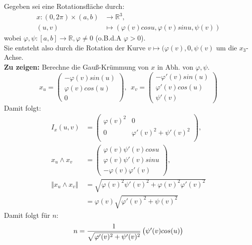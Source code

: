 \begin{problem*}[2a]
Gegeben sei eine Rotationsfläche durch:
\begin{align*}
	x:(0,2\pi) \times (a,b) &\to \mathbb{R}^3, \\
	(u,v) &\mapsto (\varphi(v)cosu, \varphi(v)sinu, \psi(v))
\end{align*}
wobei $\varphi, \psi: [a,b] \to \mathbb{R}, \varphi \neq 0$ (o.B.d.A $\varphi > 0$).\\ 
Sie entsteht also durch die Rotation der Kurve $ v \mapsto (\varphi(v), 0, \psi(v)$ um die $x_3$-Achse.\\
\textbf{Zu zeigen:} Berechne die Gauß-Krümmung von $ x $ in Abh. von $\varphi, \psi$.
\begin{equation*}
  	x_u = 
    \begin{pmatrix}
  		-\varphi(v)sin(u) \\
  		\varphi(v)cos(u) \\
  		0	
  	\end{pmatrix}, \enspace
    x_v = 
    \begin{pmatrix}
    		-\varphi'(v)sin(u) \\
    		\varphi'(v)cos(u) \\
    		\psi'(v)	
  	\end{pmatrix} 
\end{equation*}
Damit folgt: 
\begin{align*}
  	I_x(u,v) &= 
  \begin{pmatrix}
    		\varphi(v)^2 & 0\\
    		0 & \varphi'(v)^2 + \psi'(v)^2 \\
  	\end{pmatrix}, \\
  	x_u \land x_v &= 
  	\begin{pmatrix}
  		\varphi(v) \psi'(v) cosu \\
  		\varphi(v) \psi'(v) sinu \\
  		-\varphi(v) \varphi'(v)
  	\end{pmatrix}, \\
  	\Vert x_u \land x_v \Vert &= \sqrt{ \varphi(v)^2 \psi'(v)^2 + \varphi(v)^2 \varphi'(v)^2} \\
    &= \varphi(v) \sqrt{ \varphi'(v)^2 + \psi(v)^2 }
\end{align*}
Damit folgt für $n$:
\begin{equation*}
\centering
	n = \frac{1}{\sqrt{ \varphi'(v)^2 + \psi'(v)^2 }} \begin{pmatrix}
	\psi'(v) cos(u) \\

\end{pmatrix}
\end{equation*}
\end{problem*}
